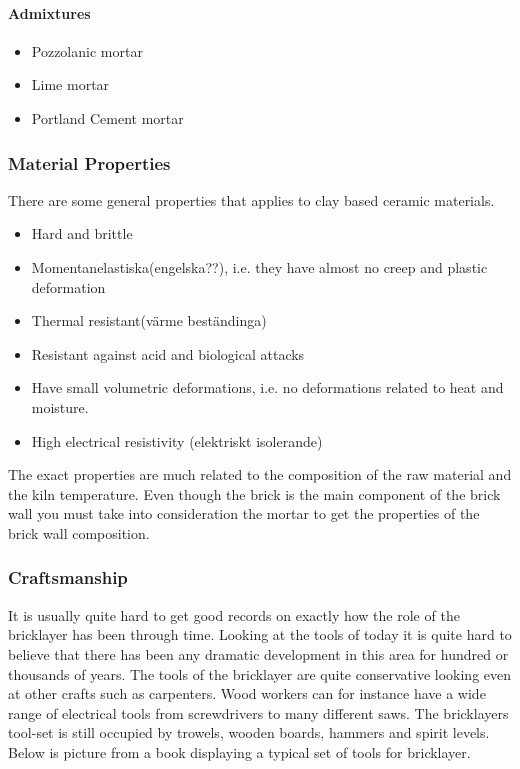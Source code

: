 \paragraph{Admixtures}


\begin{itemize}
\item Pozzolanic mortar
\item Lime mortar
\item Portland Cement mortar
\end{itemize}

\subsubsection{Material Properties}
There are some general properties that applies to clay based ceramic materials.\\

\begin{itemize}
\item Hard and brittle
\item Momentanelastiska(engelska??),
i.e. they have almost no creep and plastic deformation
\item Thermal resistant(värme beständinga)
\item Resistant against acid and biological attacks
\item Have small volumetric deformations,
i.e. no deformations related to heat and moisture.
\item High electrical resistivity  (elektriskt isolerande)
\end{itemize}

The exact properties are much related to the composition of the raw material and the kiln temperature. Even though the brick is the main component of the brick wall you must take into consideration the mortar to get the properties of the brick wall composition.

\subsubsection{Craftsmanship}

It is usually quite hard to get good records on exactly how the role of the bricklayer has been through time. Looking at the tools of today it is quite hard to believe that there has been any dramatic development in this area for hundred or thousands of years. The tools of the bricklayer are quite conservative looking even at other crafts such as carpenters. Wood workers can for instance have a wide range of electrical tools from screwdrivers to many different saws. The bricklayers tool-set is still occupied by trowels, wooden boards, hammers and spirit levels. Below is picture from a book displaying a typical set of tools for bricklayer.

